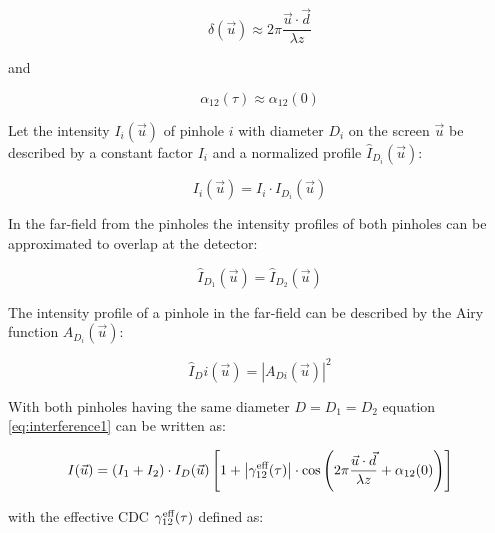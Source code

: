 \documentclass{osa-article}
\begin{document}
\begin{equation}
    \delta(\vec{u}) \approx 2 \pi \frac{\vec{u} \cdot \vec{d}}{\lambda z}
\end{equation}

and

\begin{equation}
    \alpha_{12}(\tau) \approx \alpha_{12}(0)
\end{equation}

Let the intensity $I_i(\vec{u})$ of pinhole $i$ with diameter $D_i$ on the screen $\vec{u}$ be described by a constant factor $I_i$ and a normalized profile $ \hat{I}_{D_i}(\vec{u}) $:

\begin{equation}
    I_i(\vec{u}) = I_i \cdot \hat{I}_{D_i}(\vec{u})
\end{equation}

In the far-field from the pinholes the intensity profiles of both pinholes can be approximated to overlap at the detector:

\begin{equation}
    \hat{I}_{D_1}(\vec{u}) = \hat{I}_{D_2}(\vec{u})
\end{equation}

The intensity profile of a pinhole in the far-field can be described by the Airy function $ A_{D_i}(\vec{u}) $:

\begin{equation}
    \hat{I}_Di(\vec{u}) = \left| A_{Di}(\vec{u}) \right|^2
\end{equation}


With both pinholes having the same diameter $D=D_1=D_2$ equation \ref{eq:interference1} can be written as:

\begin{equation}
    I(\vec{u}) = (I_1 + I_2) \cdot I_D(\vec{u}) \left[ 1 + \left| \gamma_{12}^{\textup{eff}}(\tau) \right| \cdot \cos{\left(2 \pi \frac{\vec{u} \cdot \vec{d}}{\lambda z}+\alpha_{12}(0)\right)} \right]
\end{equation}

with the effective CDC $\gamma_{12}^{\textup{eff}}(\tau)$ defined as:
\end{document}
